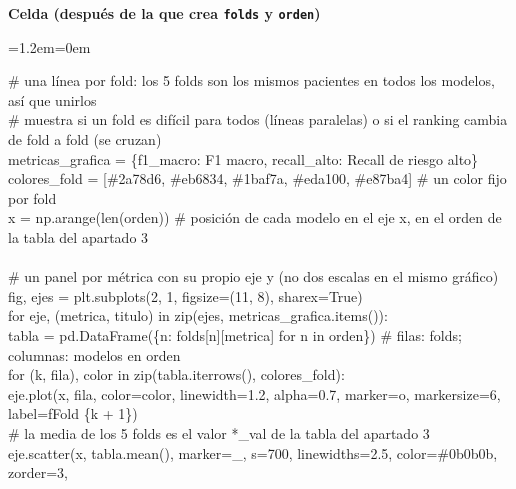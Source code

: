 \documentclass[11pt,a4paper]{article}
\newenvironment{codigo}
  {\par\smallskip\begin{list}{}{\leftmargin=1.2em\rightmargin=0em}\item\relax\ttfamily\scriptsize\raggedright}
  {\end{list}\smallskip}
\begin{document}
{\smallskip\noindent\textbf{Celda (después de la que crea \texttt{folds} y \texttt{orden})}\par
\begin{codigo}
\# una línea por fold: los 5 folds son los mismos pacientes en todos los modelos, así que unirlos \\{}
\# muestra si un fold es difícil para todos (líneas paralelas) o si el ranking cambia de fold a fold (se cruzan) \\{}
metricas\_\allowbreak{}grafica = \{\textquotedbl{}f1\_\allowbreak{}macro\textquotedbl{}: \textquotedbl{}F1 macro\textquotedbl{}, \textquotedbl{}recall\_\allowbreak{}alto\textquotedbl{}: \textquotedbl{}Recall de riesgo alto\textquotedbl{}\} \\{}
colores\_\allowbreak{}fold = [\textquotedbl{}\#2a78d6\textquotedbl{}, \textquotedbl{}\#eb6834\textquotedbl{}, \textquotedbl{}\#1baf7a\textquotedbl{}, \textquotedbl{}\#eda100\textquotedbl{}, \textquotedbl{}\#e87ba4\textquotedbl{}]   \# un color fijo por fold \\{}
x = np.arange(len(orden))   \# posición de cada modelo en el eje x, en el orden de la tabla del apartado 3 \\{}
\mbox{} \\{}
\# un panel por métrica con su propio eje y (no dos escalas en el mismo gráfico) \\{}
fig, ejes = plt.subplots(2, 1, figsize=(11, 8), sharex=True) \\{}
for eje, (metrica, titulo) in zip(ejes, metricas\_\allowbreak{}grafica.items()): \\{}
\hspace*{2.08em}tabla = pd.DataFrame(\{n: folds[n][metrica] for n in orden\})   \# filas: folds; columnas: modelos en orden \\{}
\hspace*{2.08em}for (k, fila), color in zip(tabla.iterrows(), colores\_\allowbreak{}fold): \\{}
\hspace*{4.16em}eje.plot(x, fila, color=color, linewidth=1.2, alpha=0.7, marker=\textquotedbl{}o\textquotedbl{}, markersize=6, label=f\textquotedbl{}Fold \{k + 1\}\textquotedbl{}) \\{}
\hspace*{2.08em}\# la media de los 5 folds es el valor *\_\allowbreak{}val de la tabla del apartado 3 \\{}
\hspace*{2.08em}eje.scatter(x, tabla.mean(), marker=\textquotedbl{}\_\allowbreak{}\textquotedbl{}, s=700, linewidths=2.5, color=\textquotedbl{}\#0b0b0b\textquotedbl{}, zorder=3, \\{}

\end{codigo}}
\end{document}
